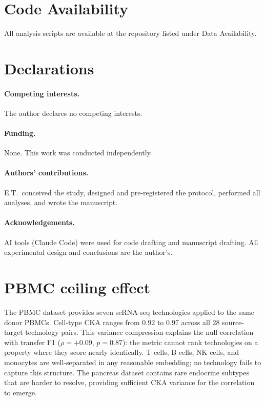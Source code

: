 \documentclass[11pt]{article}
\begin{document}
\section*{Code Availability}

All analysis scripts are available at the repository listed under Data
Availability.

\section*{Declarations}

\paragraph{Competing interests.} The author declares no competing
interests.

\paragraph{Funding.} None. This work was conducted independently.

\paragraph{Authors' contributions.} E.T.\ conceived the study,
designed and pre-registered the protocol, performed all analyses, and
wrote the manuscript.

\paragraph{Acknowledgements.} AI tools (Claude Code) were used for code
drafting and manuscript drafting. All experimental design and conclusions
are the author's.


\appendix

\section{PBMC ceiling effect}
\label{app:pbmc}

The PBMC dataset \citep{ding2020systematic} provides seven scRNA-seq
technologies applied to the same donor PBMCs. Cell-type CKA ranges from
0.92 to 0.97 across all 28 source-target technology pairs. This
variance compression explains the null correlation with transfer F1
($\rho = +0.09$, $p = 0.87$): the metric cannot rank technologies on
a property where they score nearly identically. T cells, B cells, NK
cells, and monocytes are well-separated in any reasonable embedding; no
technology fails to capture this structure. The pancreas dataset contains
rare endocrine subtypes that are harder to resolve, providing sufficient
CKA variance for the correlation to emerge.
\end{document}

